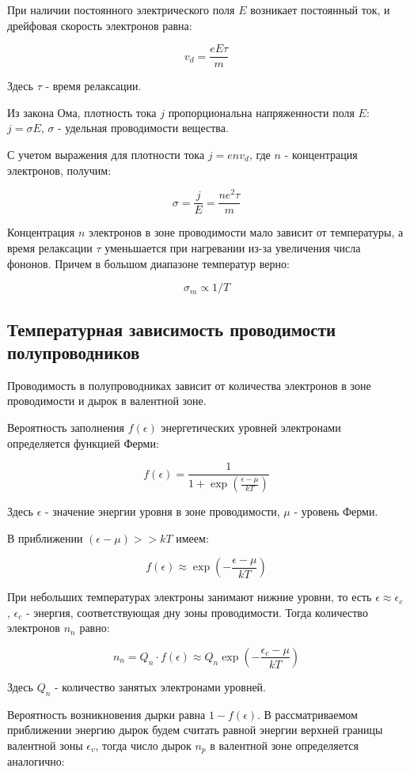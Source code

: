 \documentclass[12pt]{kiarticle} %
\begin{document}
	При наличии постоянного электрического поля $E$ возникает постоянный ток, и дрейфовая скорость электронов равна: 
	
	\[ v_d = \frac{eE\tau}{m} \]
	
	Здесь $\tau$ - время релаксации. 
	
	Из закона Ома, плотность тока $j$ пропорциональна напряженности поля $E$: $j = \sigma E$, $\sigma$ - удельная проводимости вещества. 
	
	С учетом выражения для плотности тока $j = env_d$, где $n$ - концентрация электронов, получим: 
	
	\[ \sigma = \frac{j}{E} = \frac{ne^2\tau}{m} \]
	
	Концентрация $n$ электронов в зоне проводимости мало зависит от температуры, а время релаксации $\tau$ уменьшается при нагревании из-за увеличения числа фононов. Причем в большом диапазоне температур верно: 
	
	\[ \sigma_m \propto 1/T \]
	
	\subsection{Температурная зависимость проводимости полупроводников}
	
	Проводимость в полупроводниках зависит от количества электронов в зоне проводимости и дырок в валентной зоне. 
	
	Вероятность заполнения $f(\epsilon)$ энергетических уровней электронами определяется функцией Ферми: 
	
	\[ f(\epsilon) = \frac{1}{1 + \exp\left(\frac{\epsilon - \mu}{kT}\right)} \]
	
	Здесь $\epsilon$ - значение энергии уровня в зоне проводимости, $\mu$ - уровень Ферми. 
	
	В приближении $(\epsilon - \mu) >> kT$ имеем: 
	
	\[ f(\epsilon) \approx \exp\left(-\frac{\epsilon - \mu}{kT}\right) \] 
	
	При небольших температурах электроны занимают нижние уровни, то есть $\epsilon \approx \epsilon_c$, $\epsilon_c$ - энергия, соответствующая дну зоны проводимости. Тогда количество электронов $n_n$ равно: 
	
	\[ n_n = Q_n\cdot f(\epsilon) \approx Q_n\exp\left(-\frac{\epsilon_c - \mu}{kT}\right) \]
	
	Здесь $Q_n$ - количество занятых электронами уровней.
	
	Вероятность возникновения дырки равна $1 - f(\epsilon)$. В рассматриваемом приближении энергию дырок будем считать равной энергии верхней границы валентной зоны $\epsilon_v$, тогда число дырок $n_p$ в валентной зоне определяется аналогично: 
	
\end{document}
